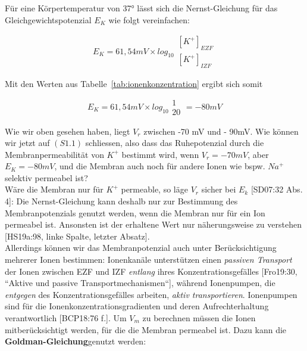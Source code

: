 {{Für eine Körpertemperatur von 37° lässt sich die Nernst-Gleichung für das Gleichgewichtspotenzial $E_K$ wie folgt vereinfachen:

\begin{equation}
 E_{K} = 61,54 mV  \times log_{10} \begin{matrix} [K^+]_{EZF} \\ \hline [K^+]_{IZF} \end{matrix}
 \label{eq:gl-nernst-reduced-start}
\end{equation}


Mit den Werten aus Tabelle~\ref{tab:ionenkonzentration}  ergibt sich somit


\begin{equation}
E_{K} = 61,54 mV  \times log_{10} \begin{matrix} 1 \\ \hline 20 \end{matrix} = -80 mV
\label{eq:gl-nernst-reduced-end}
\end{equation}


Wie wir oben gesehen haben, liegt $V_r$ zwischen -70 mV und - 90mV. Wie können wir jetzt auf $(S1.1)$ schliessen, also dass das Ruhepotenzial durch die Membranpermeabilität von $K^+$ bestimmt wird, wenn $V_r = -70 mV$, aber $E_K = -80 mV$, und die Membran auch noch für andere Ionen wie bspw. $Na^+$ selektiv permeabel ist\footnotemark[30]? \\
Wäre die Membran nur für $K^+$ permeable, so läge $V_r$ sicher bei $E_k$ [SD07:32 Abs. 4]: Die Nernst-Gleichung kann deshalb nur zur Bestimmung des Membranpotenzials genutzt werden, wenn die Membran nur für ein Ion permeabel ist. Ansonsten ist der erhaltene Wert nur näherungsweise zu verstehen [HS19a:98, linke Spalte, letzter Absatz].\\

Allerdings können wir das Membranpotenzial auch unter Berücksichtigung mehrerer Ionen bestimmen: Ionenkanäle unterstützen einen \textit{passiven Transport} der Ionen zwischen EZF und IZF \textit{entlang} ihres Konzentrationsgefälles [Fro19:30, ``Aktive und passive Transportmechanismen``], während Ionenpumpen, die \textit{entgegen} des Konzentrationsgefälles arbeiten, \textit{aktiv transportieren}\footnotemark[31].
Ionenpumpen sind für die Ionenkonzentrationsgradienten und deren Aufrechterhaltung verantwortlich [BCP18:76 f.]\footnotemark[32].
Um $V_m$ zu berechnen müssen die Ionen mitberücksichtigt werden, für die die Membran permeabel ist. 
Dazu kann die \textbf{Goldman-Gleichung}\footnotemark[33] genutzt werden\footnotemark[34]:

}}
